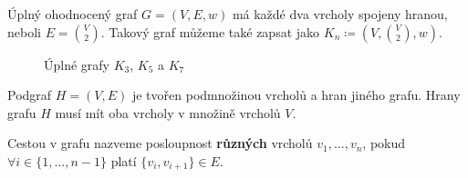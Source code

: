 \begin{definition}
    \label{definice:uplny_ohodnoceny_graf}
    Úplný ohodnocený graf $G = (V, E, w)$ má každé dva vrcholy spojeny hranou, neboli $E = \binom{V}{2}$. Takový graf můžeme také zapsat jako $K_n \coloneqq (V,\binom{V}{2},w)$.
    \begin{figure}[h]
        \centering
        \begin{subfigure}[b]{0.3\textwidth}
            \centering
        \end{subfigure}
        \begin{subfigure}[b]{0.3\textwidth}
            \centering
        \end{subfigure}
        \begin{subfigure}[b]{0.3\textwidth}
            \centering
        \end{subfigure}
        \caption{Úplné grafy $K_3$, $K_5$ a $K_7$}
        \label{obr:uplne_ohodnocene_grafy}

    \end{figure}
\end{definition}

\begin{definition}[Podgraf]
    Podgraf $H = (V, E)$ je tvořen podmnožinou vrcholů a hran jiného grafu. Hrany grafu $H$ musí mít oba vrcholy v množině vrcholů $V$.
    
\end{definition}

\begin{definition}[Cesta]
    \label{definice:cesta}
    Cestou v grafu nazveme posloupnost \textbf{různých} vrcholů $v_1, \ldots, v_n$, pokud $\forall i \in \{1,\ldots, n-1\}$ platí $\{v_i, v_{i+1}\} \in E$.  
\end{definition}

